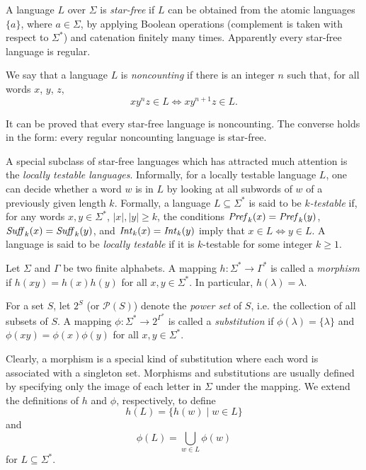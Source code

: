 A language $L$ over $\Sigma$ is \emph{star-free} if $L$ can be obtained from the atomic languages $\{a\}$, where $a \in \Sigma$, by applying Boolean operations (complement is taken with respect to $\Sigma^*$) and catenation finitely many times. Apparently every star-free language is regular.

We say that a language $L$ is \emph{noncounting} if there is an integer $n$ such that, for all words $x$, $y$, $z$, $$x y^n z \in L \Leftrightarrow x y^{n+1} z \in L.$$

It can be proved that every star-free language is noncounting. The converse holds in the form: every regular noncounting language is star-free.

A special subclass of star-free languages which has attracted much attention is the \emph{locally testable languages}. Informally, for a locally testable language $L$, one can decide whether a word $w$ is in $L$ by looking at all subwords of $w$ of a previously given length $k$. Formally, a language $L \subseteq \Sigma^*$ is said to be \emph{$k$-testable} if, for any words $x, y \in \Sigma^*$, $|x|, |y| \ge k$, the conditions $\mbox{\it Pref\/}_k(x) = \mbox{\it Pref\/}_k(y)$, $\mbox{\it Suff\/}_k(x) = \mbox{\it Suff\/}_k(y)$, and $\mbox{\it Int\/}_k(x) = \mbox{\it Int\/}_k(y)$ imply that $x \in L \Leftrightarrow y \in L$. A language is said to be \emph{locally testable} if it is $k$-testable for some integer $k \ge 1$.

Let $\Sigma$ and $\Gamma$ be two finite alphabets. A mapping $h: \Sigma^* \to \Gamma^*$ is called a \emph{morphism} if $h(xy) = h(x) h(y)$ for all $x, y \in \Sigma^*$. In particular, $h(\lambda) = \lambda$.

For a set $S$, let $2^S$ (or $\mathcal{P}(S)$) denote the \emph{power set} of $S$, i.e. the collection of all subsets of $S$. A mapping $\phi: \Sigma^* \to 2^{\Gamma^*}$ is  called a \emph{substitution} if $\phi(\lambda) = \{\lambda\}$ and $\phi(xy) = \phi(x) \phi(y)$ for all $x, y \in \Sigma^*$.

Clearly, a morphism is a special kind of substitution where each word is associated with a singleton set. Morphisms and substitutions are usually defined by specifying only the image of each letter in $\Sigma$ under the mapping. We extend the definitions of $h$ and $\phi$, respectively, to define $$h(L) = \{h(w) \mid w \in L\}$$ and $$\phi(L) = \bigcup_{w \in L}\phi(w)$$ for $L \subseteq \Sigma^*$.

